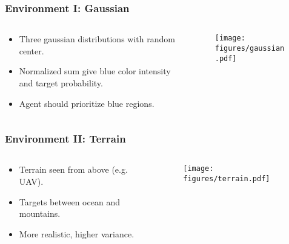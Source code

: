 \begin{frame}
    \frametitle{Environment I: Gaussian}
    \begin{columns}
        \begin{column}{0.5\textwidth}
            \begin{itemize}
                \item Three gaussian distributions with random center.
                \item Normalized sum give blue color intensity and target probability.
                \item Agent should prioritize blue regions.
            \end{itemize}
        \end{column}
        \begin{column}{0.5\textwidth}
            \begin{figure}
                \centering
                \texttt{[image: figures/gaussian.pdf]}
            \end{figure}
        \end{column}
    \end{columns}    
\end{frame}

\begin{frame}
    \frametitle{Environment II: Terrain}
    \begin{columns}
        \begin{column}{0.5\textwidth}
            \begin{itemize}
                \item Terrain seen from above (e.g. UAV).
                \item Targets between ocean and mountains.
                \item More realistic, higher variance.
            \end{itemize}
        \end{column}
        \begin{column}{0.5\textwidth}
            \begin{figure}
                \centering
                \texttt{[image: figures/terrain.pdf]}
            \end{figure}
        \end{column}
    \end{columns}   
\end{frame}

